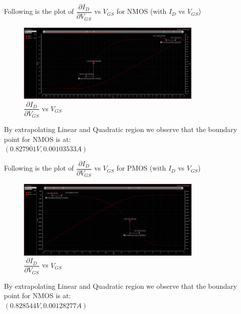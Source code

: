 \documentclass[journal, onecolumn]{IEEEtran} %
\begin{document}
\begin{enumerate}[2.]
{		Following is the plot of $\dfrac{\partial{I_{D}}}{\partial{V_{GS}}}$ vs $V_{GS}$ for NMOS (with $I_{D}$ vs $V_{GS}$)
		\begin{figure}[H]
			\centering
			\includegraphics[width=0.8\textwidth]{2-3nmos}
			\caption{$\dfrac{\partial{I_{D}}}{\partial{V_{GS}}}$ vs $V_{GS}$}
			\label{fig:2-3nmos}
		\end{figure}

		By extrapolating Linear and Quadratic region we observe that the boundary point for NMOS is at:\\
		$(0.827901V, 0.00103533A)$


		Following is the plot of $\dfrac{\partial{I_{D}}}{\partial{V_{GS}}}$ vs $V_{GS}$ for PMOS (with $I_{D}$ vs $V_{GS}$)
		\begin{figure}[H]
			\centering
			\includegraphics[width=0.8\textwidth]{2-3pmos}
			\caption{$\dfrac{\partial{I_{D}}}{\partial{V_{GS}}}$ vs $V_{GS}$}
			\label{fig:2-3pmos}
		\end{figure}

		By extrapolating Linear and Quadratic region we observe that the boundary point for NMOS is at:\\
		$(0.828544V, 0.00128277A)$
	}

\end{enumerate}
\end{document}

